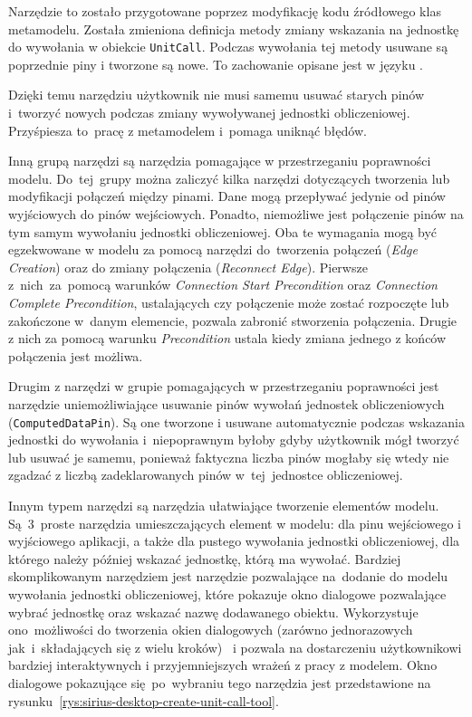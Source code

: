 Narzędzie to zostało przygotowane poprzez modyfikację kodu źródłowego klas
metamodelu. Została zmieniona definicja metody zmiany wskazania na jednostkę do
wywołania w obiekcie \texttt{UnitCall}. Podczas wywołania tej metody usuwane są
poprzednie piny i tworzone są nowe. To zachowanie opisane jest w języku
\Java{}.

Dzięki temu narzędziu użytkownik nie musi samemu usuwać starych pinów
i~tworzyć nowych podczas zmiany wywoływanej jednostki obliczeniowej.
Przyśpiesza to~pracę z
metamodelem i~pomaga uniknąć błędów.

Inną grupą narzędzi są narzędzia pomagające w przestrzeganiu poprawności
modelu. Do~tej~grupy można zaliczyć kilka narzędzi dotyczących tworzenia lub
modyfikacji połączeń między pinami. Dane mogą przepływać jedynie od pinów
wyjściowych do pinów wejściowych. Ponadto, niemożliwe jest połączenie pinów
na tym samym wywołaniu jednostki obliczeniowej. Oba te wymagania mogą być
egzekwowane w modelu za pomocą narzędzi do~tworzenia połączeń (\emph{Edge
	Creation}) oraz do zmiany połączenia (\emph{Reconnect Edge}). Pierwsze
z~nich~za~pomocą warunków \emph{Connection Start Precondition} oraz
\emph{Connection Complete Precondition}, ustalających czy połączenie może
zostać
rozpoczęte lub zakończone w~danym elemencie, pozwala zabronić stworzenia
połączenia. Drugie z nich za pomocą warunku \emph{Precondition} ustala kiedy
zmiana jednego z końców połączenia jest możliwa.

Drugim z narzędzi w grupie pomagających w przestrzeganiu poprawności jest
narzędzie uniemożliwiające usuwanie pinów wywołań jednostek obliczeniowych
(\texttt{ComputedDataPin}). Są one tworzone i usuwane automatycznie podczas
wskazania jednostki do wywołania i~niepoprawnym byłoby gdyby użytkownik mógł
tworzyć lub usuwać je samemu, ponieważ faktyczna liczba pinów mogłaby się
wtedy nie
zgadzać z liczbą zadeklarowanych pinów w~tej~jednostce obliczeniowej.

Innym typem narzędzi są narzędzia ułatwiające tworzenie elementów modelu.
Są~3~proste narzędzia umieszczających element w modelu: dla pinu wejściowego i
wyjściowego aplikacji, a także dla pustego wywołania jednostki obliczeniowej,
dla
którego należy później wskazać jednostkę, którą ma wywołać. Bardziej
skomplikowanym
narzędziem jest narzędzie pozwalające na~dodanie do modelu wywołania jednostki
obliczeniowej, które pokazuje okno dialogowe pozwalające wybrać jednostkę oraz
wskazać nazwę dodawanego obiektu. Wykorzystuje ono~możliwości \SiriusDesktop{}
do tworzenia okien dialogowych (zarówno jednorazowych
jak~i~składających się z wielu
kroków)~\cite{sirius-desktop-documentation-tools} i
pozwala na dostarczeniu użytkownikowi
bardziej interaktywnych i przyjemniejszych wrażeń z pracy z modelem. Okno
dialogowe
pokazujące się~po~wybraniu
tego narzędzia jest przedstawione na
rysunku~\ref{rys:sirius-desktop-create-unit-call-tool}.

